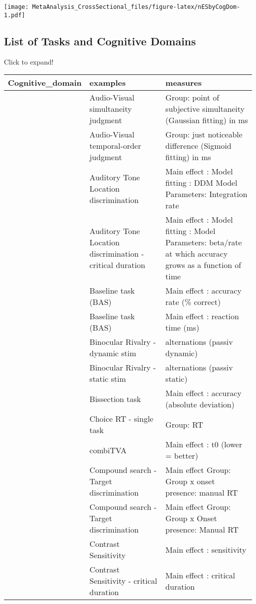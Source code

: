 \documentclass[
]{book}
\begin{document}
\texttt{[image: MetaAnalysis\_CrossSectional\_files/figure-latex/nESbyCogDom-1.pdf]}

\hypertarget{list-of-tasks-and-cognitive-domains}{%
\subsection{List of Tasks and Cognitive Domains}\label{list-of-tasks-and-cognitive-domains}}

Click to expand!

\begin{tabular}{l|l|l}
\hline
Cognitive\_domain & examples & measures\\
\hline
 & Audio-Visual simultaneity judgment & Group: point of subjective simultaneity (Gaussian fitting) in ms\\
\cline{2-3}
 & Audio-Visual temporal-order judgment & Group: just noticeable difference (Sigmoid fitting) in ms\\
\cline{2-3}
 & Auditory Tone Location discrimination & Main effect : Model fitting : DDM Model Parameters: Integration rate\\
\cline{2-3}
 & Auditory Tone Location discrimination - critical duration & Main effect : Model fitting : Model Parameters: beta/rate at which accuracy grows as a function of time\\
\cline{2-3}
 & Baseline task (BAS) & Main effect : accuracy rate (\% correct)\\
\cline{2-3}
 & Baseline task (BAS) & Main effect : reaction time (ms)\\
\cline{2-3}
 & Binocular Rivalry - dynamic stim & alternations (passiv dynamic)\\
\cline{2-3}
 & Binocular Rivalry - static stim & alternations (passiv static)\\
\cline{2-3}
 & Bissection task & Main effect : accuracy (absolute deviation)\\
\cline{2-3}
 & Choice RT - single task & Group: RT\\
\cline{2-3}
 & combiTVA & Main effect : t0 (lower = better)\\
\cline{2-3}
 & Compound search - Target discrimination & Main effect Group: Group x onset presence: manual RT\\
\cline{2-3}
 & Compound search - Target discrimination & Main effect Group: Group x Onset presence: Manual RT\\
\cline{2-3}
 & Contrast Sensitivity & Main effect : sensitivity\\
\cline{2-3}
 & Contrast Sensitivity - critical duration & Main effect : critical duration\\

\end{tabular}
\end{document}
